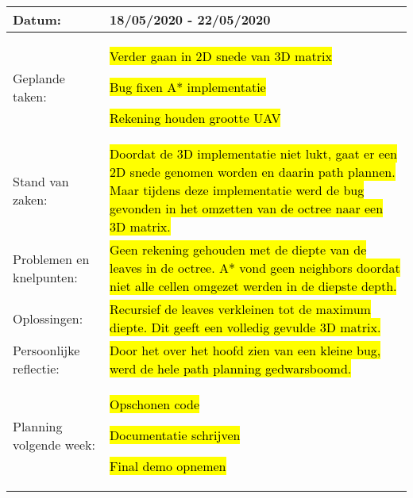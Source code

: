 \begin{tabularx}{\textwidth}{| l | X |}
  \hline
  Datum: & 18/05/2020 - 22/05/2020\\
  \hline
  Geplande taken: &
  \begin{compactitem}
    \item \hl{Verder gaan in 2D snede van 3D matrix}
    \item \hl{Bug fixen A* implementatie}
    \item \hl{Rekening houden grootte UAV}
  \end{compactitem}\\
  \hline
  Stand van zaken: & \hl{Doordat de 3D implementatie niet lukt, gaat er een 2D snede genomen worden en daarin path plannen. Maar tijdens deze implementatie werd de bug gevonden in het omzetten van de octree naar een 3D matrix.}\\
  \hline
  Problemen en knelpunten: & \hl{Geen rekening gehouden met de diepte van de leaves in de octree. A* vond geen neighbors doordat niet alle cellen omgezet werden in de diepste depth.}\\
  \hline
  Oplossingen: & \hl{Recursief de leaves verkleinen tot de maximum diepte. Dit geeft een volledig gevulde 3D matrix.}\\
  \hline
  Persoonlijke reflectie: & \hl{Door het over het hoofd zien van een kleine bug, werd de hele path planning gedwarsboomd.}\\
  \hline
  Planning volgende week: &
  \begin{compactitem}
    \item \hl{Opschonen code}
    \item \hl{Documentatie schrijven}
    \item \hl{Final demo opnemen}
  \end{compactitem}\\
  \hline
\end{tabularx}